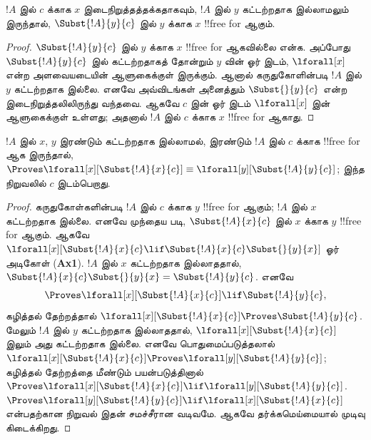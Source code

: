\documentclass[11pt,a4paper,openany]{memoir}
\begin{document}
\begin{lem}
$!A$ இல் $c$ க்காக $x$ இடைநிறுத்தத்தக்கதாகவும், $!A$ இல் $y$
கட்டற்றதாக இல்லாமலும் இருந்தால், $\Subst{!A}{y}{c}$ இல் $y$ க்காக $x$
!!{free for} ஆகும்.
\end{lem}

\begin{proof}
$\Subst{!A}{y}{c}$ இல் $y$ க்காக $x$ !!{free for} ஆகவில்லை என்க.
அப்போது $\Subst{!A}{y}{c}$ இல் கட்டற்றதாகத் தோன்றும் $y$ வின் ஓர்
இடம், $\lforall[x]$ என்ற அளவையடையின் ஆளுகைக்குள் இருக்கும். ஆனால்
கருதுகோளின்படி $!A$ இல் $y$ கட்டற்றதாக இல்லை. எனவே அவ்விடங்கள் அனைத்தும்
$\Subst{}{y}{c}$ என்ற இடைநிறுத்தலிலிருந்து வந்தவை. ஆகவே $c$ இன் ஓர்
இடம் $\lforall[x]$ இன் ஆளுகைக்குள் உள்ளது; அதனால் $!A$ இல் $c$
க்காக $x$ !!{free for} ஆகாது.
\end{proof}

\begin{lem}[கட்டுண்ட மாறியை மாற்றுதல்]
$!A$ இல் $x$, $y$ இரண்டும் கட்டற்றதாக இல்லாமல், இரண்டும் $!A$ இல் $c$
க்காக !!{free for} ஆக இருந்தால்,
$\Proves \lforall[x][\Subst{!A}{x}{c}] \equiv
\lforall[y][\Subst{!A}{y}{c}]$; இந்த நிறுவலில் $c$ இடம்பெறாது.
\end{lem}

\begin{proof}
கருதுகோள்களின்படி $!A$ இல் $c$ க்காக $y$ !!{free for} ஆகும்;
$!A$ இல் $x$ கட்டற்றதாக இல்லை. எனவே முந்தைய
 படி, $\Subst{!A}{x}{c}$ இல் $x$ க்காக $y$
!!{free for} ஆகும். ஆகவே
$\lforall[x][\Subst{!A}{x}{c} \lif \Subst{!A}{x}{c} \Subst{}{y}{x}]$
ஓர் அடிகோள் (\textbf{Ax1}). $!A$ இல் $x$ கட்டற்றதாக இல்லாததால்,
$\Subst{!A}{x}{c} \Subst{}{y}{x} = \Subst{!A}{y}{c}$. எனவே
\[
\Proves \lforall[x][\Subst{!A}{x}{c}] \lif \Subst{!A}{y}{c},
\]
கழித்தல் தேற்றத்தால் $\lforall[x][\Subst{!A}{x}{c}] \Proves
\Subst{!A}{y}{c}$. மேலும் $!A$ இல் $y$ கட்டற்றதாக இல்லாததால்,
$\lforall[x][\Subst{!A}{x}{c}]$ இலும் அது கட்டற்றதாக இல்லை. எனவே
பொதுமைப்படுத்தலால்
$\lforall[x][\Subst{!A}{x}{c}] \Proves
\lforall[y][\Subst{!A}{y}{c}]$; கழித்தல் தேற்றத்தை மீண்டும்
பயன்படுத்தினால் $\Proves
\lforall[x][\Subst{!A}{x}{c}] \lif \lforall[y][\Subst{!A}{y}{c}]$.
$\Proves \lforall[y][\Subst{!A}{y}{c}] \lif \lforall[x]
[\Subst{!A}{x}{c}]$ என்பதற்கான நிறுவல் இதன் சமச்சீரான வடிவமே.
ஆகவே தர்க்கமெய்மையால் முடிவு கிடைக்கிறது.
\end{proof}
\end{document}
